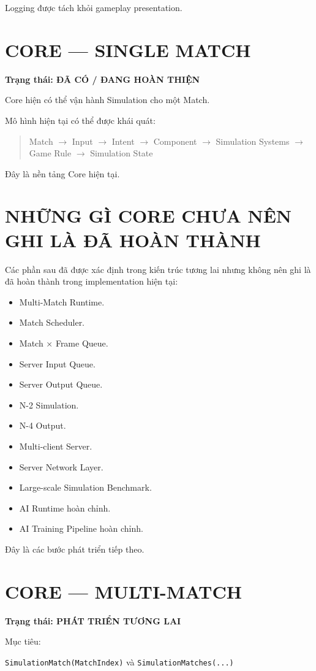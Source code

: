 \documentclass[12pt,a4paper]{article}
\newcommand{\flow}[1]{%
  \begin{quote}\centering\ttfamily #1\end{quote}%
}
\begin{document}
Logging được tách khỏi gameplay presentation.

\section{CORE --- SINGLE MATCH}
\textbf{Trạng thái: ĐÃ CÓ / ĐANG HOÀN THIỆN}

Core hiện có thể vận hành Simulation cho một Match.

Mô hình hiện tại có thể được khái quát:

\flow{Match $\rightarrow$ Input $\rightarrow$ Intent $\rightarrow$ Component $\rightarrow$ Simulation Systems $\rightarrow$ Game Rule $\rightarrow$ Simulation State}

Đây là nền tảng Core hiện tại.

\section{NHỮNG GÌ CORE CHƯA NÊN GHI LÀ ĐÃ HOÀN THÀNH}

Các phần sau đã được xác định trong kiến trúc tương lai nhưng không nên ghi là đã hoàn thành trong implementation hiện tại:
\begin{itemize}[nosep]
  \item Multi-Match Runtime.
  \item Match Scheduler.
  \item Match × Frame Queue.
  \item Server Input Queue.
  \item Server Output Queue.
  \item N-2 Simulation.
  \item N-4 Output.
  \item Multi-client Server.
  \item Server Network Layer.
  \item Large-scale Simulation Benchmark.
  \item AI Runtime hoàn chỉnh.
  \item AI Training Pipeline hoàn chỉnh.
\end{itemize}

Đây là các bước phát triển tiếp theo.

\section{CORE --- MULTI-MATCH}
\textbf{Trạng thái: PHÁT TRIỂN TƯƠNG LAI}

Mục tiêu:

\texttt{SimulationMatch(MatchIndex)} và \texttt{SimulationMatches(...)}
\end{document}
